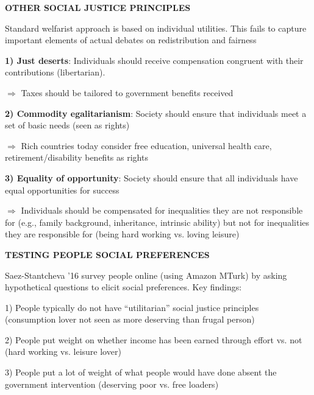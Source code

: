 \documentclass[landscape]{slides}
\begin{document}
\begin{slide}
\begin{center}
{\bf OTHER SOCIAL JUSTICE PRINCIPLES}
\end{center}

Standard welfarist approach is based on individual utilities. This fails to capture important
elements of actual debates on redistribution and fairness

{\bf 1) Just deserts}: Individuals should receive compensation congruent with their contributions
(libertarian). 

\small

$\Rightarrow$ Taxes should be tailored to government benefits received 

\normalsize

\vspace{-3pt}

{\bf 2) Commodity egalitarianism}:
Society should ensure that individuals meet a set of basic needs (seen as rights) 

\small

$\Rightarrow$ Rich countries today consider free education, universal health care, retirement/disability
benefits as rights

\normalsize

{\bf 3) Equality of opportunity}: Society should
ensure that all individuals have equal opportunities for success 

\small

$\Rightarrow$ Individuals should be compensated for inequalities they are not responsible for (e.g., family background,
inheritance, intrinsic ability) but not for inequalities they are responsible for (being hard working vs. loving
leisure)

\end{slide}



\begin{slide}
\begin{center}
{\bf TESTING PEOPLE SOCIAL PREFERENCES}
\end{center}
Saez-Stantcheva '16 survey people online (using Amazon MTurk) by asking hypothetical questions
to elicit social preferences. Key findings:

1) People typically do not have ``utilitarian'' social justice principles (consumption lover not seen as more
deserving than frugal person)

2) People put weight on whether income has been earned through effort vs. not (hard working
vs. leisure lover)

3) People put a lot of weight of what people would have done absent the government intervention
(deserving poor vs. free loaders)

\end{slide}
\end{document}
